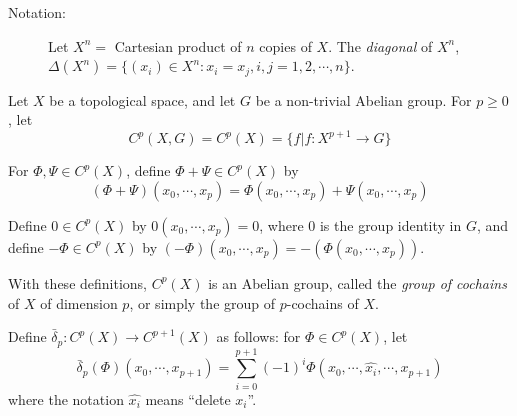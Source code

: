 \documentclass{article}
\begin{document}
\begin{description}

\item[Notation:] Let $X^n=$ Cartesian product of $n$ copies of $X$. The \emph{diagonal} of $X^n$, $\Delta (X^n)= \{ (x_i) \in X^n: x_i=x_j, i,j=1,2, \cdots, n \}$.

\end{description} 

Let $X$ be a topological space, and let $G$ be a non-trivial Abelian group. For $p \geq 0$, let 
\begin{equation*}
C^p(X,G)=C^p(X)= \{ f \vert f: X^{p+1} \longrightarrow G \}
\end{equation*}

For $\Phi,\Psi \in C^p(X)$, define $\Phi + \Psi \in C^p(X)$ by
\begin{equation*}
(\Phi + \Psi)(x_0, \cdots, x_p) = \Phi (x_0, \cdots, x_p) + \Psi (x_0,\cdots, x_p)
\end{equation*}

Define $0 \in C^p(X)$ by $0(x_0,\cdots,x_p)=0$, where $0$ is the group identity in $G$, and define $-\Phi \in C^p(X)$ by $(-\Phi)(x_0,\cdots,x_p)=-(\Phi (x_0,\cdots,x_p))$.

With these definitions, $C^p(X)$ is an Abelian group, called the \emph{group of cochains} of $X$ of dimension $p$, or simply the group of $p$-cochains of $X$.

Define $\bar{\delta}_p: C^p(X) \longrightarrow C^{p+1}(X)$ as follows: for $\Phi \in C^p(X)$, let 
\begin{equation*}
\bar{\delta}_p(\Phi)(x_0,\cdots,x_{p+1})= \sum_{i=0}^{p+1}(-1)^i \Phi (x_0,\cdots,\hat{x_i},\cdots,x_{p+1})
\end{equation*}
where the notation $\hat{x_i}$ means ``delete $x_i$''.
\end{document}
